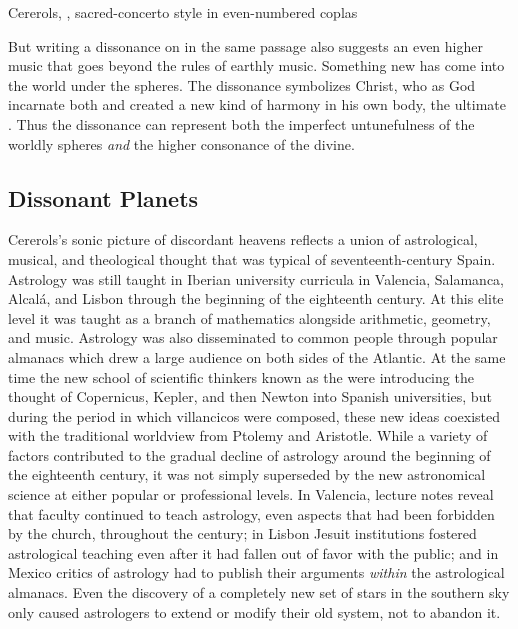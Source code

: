
{Cererols, , sacred-concerto style in even-numbered
coplas}

But writing a dissonance on  in the same passage also
suggests an even higher music that goes beyond the rules of earthly music.
Something new has come into the world under the spheres.
The dissonance symbolizes Christ, who as God incarnate both  and created a new kind of harmony in his own
body, the ultimate .
Thus the dissonance can represent both the imperfect untunefulness of
the worldly spheres \emph{and} the higher consonance of the divine.


\subsection{Dissonant Planets}

Cererols's sonic picture of discordant heavens reflects a union of
astrological, musical, and theological thought that was typical of
seventeenth-century Spain.
Astrology was still taught in Iberian university curricula in Valencia,
Salamanca, Alcalá, and Lisbon through the beginning of the eighteenth
century.%
    \Autocites
    {Lanuza:Astrology-Valencia}
    {Nieto-Galan:History-Science-Spain}
At this elite level it was taught as a branch of mathematics alongside
arithmetic, geometry, and music.
Astrology was also disseminated to common people through popular almanacs
which drew a large audience on both sides of the Atlantic.%
    \Autocite
    {Kassell:History-Astrology}
At the same time the new school of scientific thinkers known as the
 were introducing the thought of Copernicus, Kepler, and then
Newton into Spanish universities, but during the period in which
 villancicos were composed, these new ideas coexisted
with the traditional worldview from Ptolemy and Aristotle.
While a variety of factors contributed to the gradual decline of astrology
around the beginning of the eighteenth century, it was not simply superseded by
the new astronomical science at either popular or professional levels.
In Valencia, lecture notes reveal that faculty continued to teach astrology,
even aspects that had been forbidden by the church, throughout the century; in
Lisbon Jesuit institutions fostered astrological teaching even after it had
fallen out of favor with the public; and in Mexico critics of astrology had to
publish their arguments \emph{within} the astrological almanacs.%
    \Autocites
    {Lanuza:Astrology-Valencia}
    {Carolino:Jesuit-Astronomy-Portugal}
    {More:Heretical-Science-Mexico}
Even the discovery of a completely new set of stars in the southern sky only
caused astrologers to extend or modify their old system, not to abandon
it.%
    \Autocites
    {Brosseder:Astrology-Peru-17C}
    {Lanuza:Updating-Astrology}

